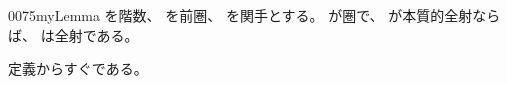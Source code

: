 \documentclass[index]{subfiles}
\begin{document}
\begin{myBlock}{0075}{myLemma}
  を階数、
  を前圏、
  を関手とする。
  が圏で、
  が本質的全射ならば、
  は全射である。
\end{myBlock}
\begin{myProof}
  定義からすぐである。
\end{myProof}
\end{document}
